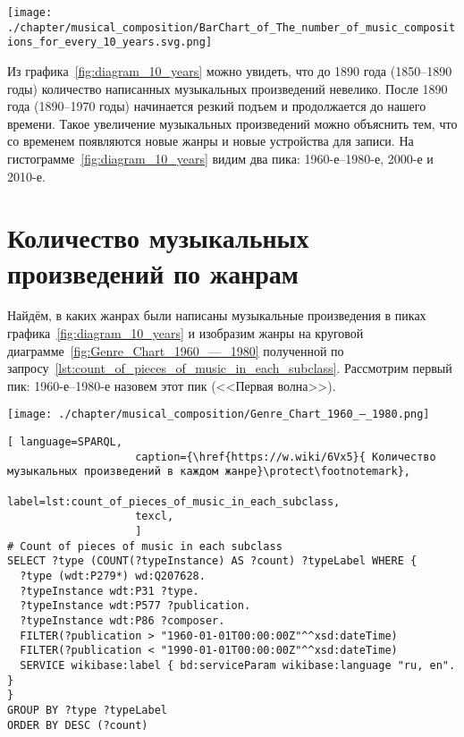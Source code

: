 \begin{marginfigure}[0\baselineskip]
	\texttt{[image: ./chapter/musical\_composition/BarChart\_of\_The\_number\_of\_music\_compositions\_for\_every\_10\_years.svg.png]}
	\caption[Гистограмма количества музыкальных композиций за каждые 10 лет с XIX века до настоящего времени]{Гистограмма количества музыкальных композиций за каждые 10 лет со второй половины XIX века до настоящего времени}%
	\label{fig:diagram_10_years}%
\end{marginfigure}
Из графика~\ref{fig:diagram_10_years} можно увидеть, что до 1890 года (1850--1890 годы) количество написанных музыкальных произведений невелико. После 1890 года (1890--1970 годы) начинается резкий подъем и продолжается до нашего времени. Такое увеличение музыкальных произведений можно объяснить тем, что со временем появляются новые жанры и новые устройства для записи. На гистограмме~\ref{fig:diagram_10_years} видим два пика: 1960-е--1980-е, 2000-е и 2010-е.


\section{Количество музыкальных произведений по жанрам}
Найдём, в каких жанрах были написаны музыкальные произведения в пиках графика~\ref{fig:diagram_10_years} и изобразим жанры на круговой диаграмме~\ref{fig:Genre_Chart_1960_—_1980} полученной по запросу~\ref{lst:count_of_pieces_of_music_in_each_subclass}. Рассмотрим первый пик: 1960-е--1980-е назовем этот пик (<<Первая волна>>).
\begin{marginfigure}[0\baselineskip]
	\texttt{[image: ./chapter/musical\_composition/Genre\_Chart\_1960\_—\_1980.png]}
	\caption[Круговая диаграмма музыкальных жанров за 1960--1980 годы во всем мире]{Круговая диаграмма музыкальных жанров за 1960--1980 годы во всем мире. Ссылка на SPARQL-запрос: \href{https://w.wiki/6Vx5}{https://w.wiki/6Vx5}.}%
	\label{fig:Genre_Chart_1960_—_1980}%
\end{marginfigure}
\begin{lstlisting}[ language=SPARQL,
                    caption={\href{https://w.wiki/6Vx5}{ Количество музыкальных произведений в каждом жанре}\protect\footnotemark},
                    label=lst:count_of_pieces_of_music_in_each_subclass,
                    texcl,
                    ]
# Count of pieces of music in each subclass
SELECT ?type (COUNT(?typeInstance) AS ?count) ?typeLabel WHERE {
  ?type (wdt:P279*) wd:Q207628.
  ?typeInstance wdt:P31 ?type.
  ?typeInstance wdt:P577 ?publication.
  ?typeInstance wdt:P86 ?composer.
  FILTER(?publication > "1960-01-01T00:00:00Z"^^xsd:dateTime)        
  FILTER(?publication < "1990-01-01T00:00:00Z"^^xsd:dateTime)
  SERVICE wikibase:label { bd:serviceParam wikibase:language "ru, en". }
}
GROUP BY ?type ?typeLabel
ORDER BY DESC (?count)
\end{lstlisting}%

